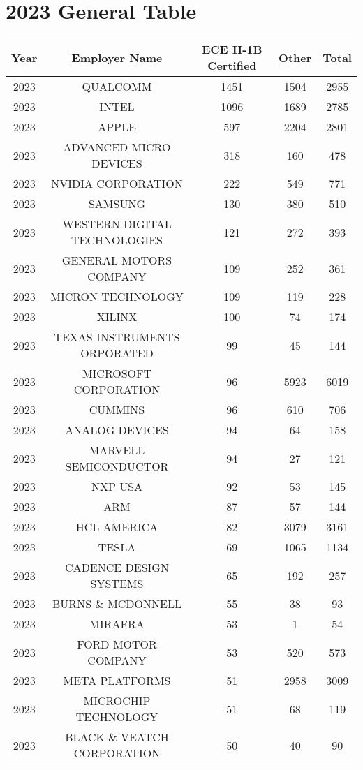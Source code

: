 \documentclass{article}%
\begin{document}
\section{2023 General Table}%
\label{sec:2023GeneralTable}%
\begin{longtable}{c|c|c|c|c}%
\hline%
Year&Employer Name&ECE \newline%
 H{-}1B \newline%
 Certified&Other&Total\\%
\hline%
2023&QUALCOMM&1451&1504&2955\\%
\hline%
2023&INTEL&1096&1689&2785\\%
\hline%
2023&APPLE&597&2204&2801\\%
\hline%
2023&ADVANCED MICRO DEVICES&318&160&478\\%
\hline%
2023&NVIDIA CORPORATION&222&549&771\\%
\hline%
2023&SAMSUNG&130&380&510\\%
\hline%
2023&WESTERN DIGITAL TECHNOLOGIES&121&272&393\\%
\hline%
2023&GENERAL MOTORS COMPANY&109&252&361\\%
\hline%
2023&MICRON TECHNOLOGY&109&119&228\\%
\hline%
2023&XILINX&100&74&174\\%
\hline%
2023&TEXAS INSTRUMENTS ORPORATED&99&45&144\\%
\hline%
2023&MICROSOFT CORPORATION&96&5923&6019\\%
\hline%
2023&CUMMINS&96&610&706\\%
\hline%
2023&ANALOG DEVICES&94&64&158\\%
\hline%
2023&MARVELL SEMICONDUCTOR&94&27&121\\%
\hline%
2023&NXP USA&92&53&145\\%
\hline%
2023&ARM&87&57&144\\%
\hline%
2023&HCL AMERICA&82&3079&3161\\%
\hline%
2023&TESLA&69&1065&1134\\%
\hline%
2023&CADENCE DESIGN SYSTEMS&65&192&257\\%
\hline%
2023&BURNS \& MCDONNELL&55&38&93\\%
\hline%
2023&MIRAFRA&53&1&54\\%
\hline%
2023&FORD MOTOR COMPANY&53&520&573\\%
\hline%
2023&META PLATFORMS&51&2958&3009\\%
\hline%
2023&MICROCHIP TECHNOLOGY&51&68&119\\%
\hline%
2023&BLACK \& VEATCH CORPORATION&50&40&90\\%

\end{longtable}
\end{document}
